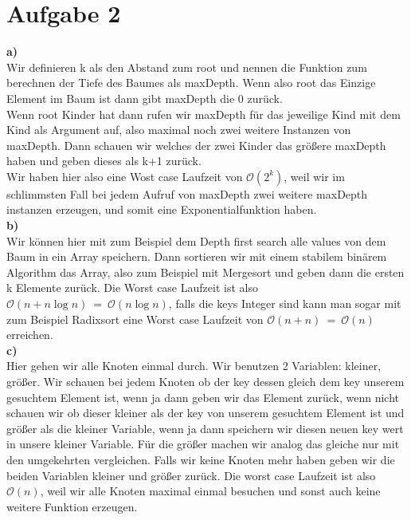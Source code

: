 \documentclass[12pt,a4paper,headsepline]{scrreprt}
\begin{document}


\section*{Aufgabe 2}
\textbf{a)}\\
Wir definieren k als den Abstand zum root und nennen die Funktion zum berechnen der Tiefe des Baumes als maxDepth. Wenn also root das Einzige Element im Baum ist dann gibt maxDepth die 0 zurück.\\
Wenn root Kinder hat dann rufen wir maxDepth für das jeweilige Kind mit dem Kind als Argument auf, also maximal noch zwei weitere Instanzen von maxDepth. Dann schauen wir welches der zwei Kinder das größere maxDepth haben und geben dieses als k+1 zurück.\\
Wir haben hier also eine Wost case Laufzeit von $\mathcal{O}(2^k)$, weil wir im schlimmsten Fall bei jedem Aufruf von maxDepth zwei weitere maxDepth instanzen erzeugen, und somit eine Exponentialfunktion haben.\\

\textbf{b)}\\
Wir können hier mit zum Beispiel dem Depth first search alle values von dem Baum in ein Array speichern. Dann sortieren wir mit einem stabilem binärem Algorithm das Array, also zum Beispiel mit Mergesort und geben dann die ersten k Elemente zurück. Die Worst case Laufzeit ist also $\mathcal{O}(n+n\log n)~=~\mathcal{O}(n\log n)$, falls die keys Integer sind kann man sogar mit zum Beispiel Radixsort eine Worst case Laufzeit von $\mathcal{O}(n+n)~=~\mathcal{O}(n)$ erreichen.\\

\textbf{c)}\\
Hier gehen wir alle Knoten einmal durch. Wir benutzen 2 Variablen: kleiner, größer. Wir schauen bei jedem Knoten ob der key dessen gleich dem key unserem gesuchtem Element ist, wenn ja dann geben wir das Element zurück, wenn nicht schauen wir ob dieser kleiner als der key von unserem gesuchtem Element ist und größer als die kleiner Variable, wenn ja dann speichern wir diesen neuen key wert in unsere kleiner Variable. Für die größer machen wir analog das gleiche nur mit den umgekehrten vergleichen. Falls wir keine Knoten mehr haben geben wir die beiden Variablen kleiner und größer zurück. Die worst case Laufzeit ist also $\mathcal{O}(n)$, weil wir alle Knoten maximal einmal besuchen und sonst auch keine weitere Funktion erzeugen.
\end{document}

